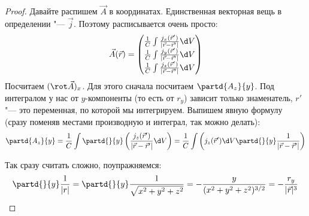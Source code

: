 	\begin{proof}
		Давайте распишем $\vec A$ в координатах.
		Единственная векторная вещь в определении "--- $\vec j$.
		Поэтому расписывается очень просто:
		\[
		\vec A(\vec r) = \begin{pmatrix}
		\frac 1 C \int \frac{j_x(\vec r')}{|\vec r - \vec r'|} \d V \\
		\frac 1 C \int \frac{j_y(\vec r')}{|\vec r - \vec r'|} \d V \\
		\frac 1 C \int \frac{j_z(\vec r')}{|\vec r - \vec r'|} \d V \\
		\end{pmatrix}
		\]
		Посчитаем $(\rot \vec A)_x$.
		Для этого сначала посчитаем $\partd{A_z}{y}$.
		Под интегралом у нас от $y$-компоненты (то есть от $r_y$) зависит только знаменатель, $r'$ "--- это переменная, по которой мы интегрируем.
		Выпишем явную формулу (сразу поменяв местами производную и интеграл, так можно делать):
		\[
		\partd{A_z}{y}
		= \frac 1 C \int \partd{}{y} \left(\frac{j_z(\vec r')}{|\vec r - \vec r'|} \d V\right)
		= \frac 1 C \int \left( j_z(\vec r') \d V \partd{}{y} \frac{1}{|\vec r - \vec r'|} \right)
		\]

		Так сразу считать сложно, поупражняемся:
		\[
		\partd{}{y} \frac{1}{|r|}
		= \partd{}{y} \frac{1}{\sqrt{x^2+y^2+z^2}}
		= - \frac{y}{(x^2+y^2+z^2)^{3/2}}
		= - \frac{r_y}{|\vec r|^3}
		\]


\end{proof}

